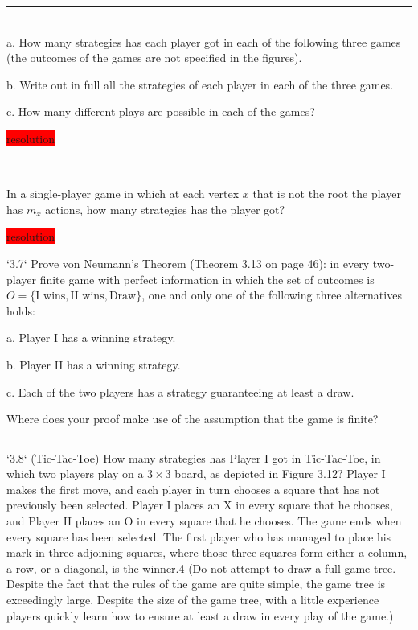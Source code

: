 \documentclass[10pt]{report}
\newenvironment{exercise}[1]
    {\vspace{0.5cm}\hrule\vspace{0.5cm}\noindent\fbox{#1}\\}
    {\vspace{0.5cm}}
\newenvironment{response}
{\vspace{0.2cm}\noindent\colorbox{red}{resolution}}
    {\vspace{0.5cm}}
\begin{document}
\begin{exercise}{3.5}
	a. How many strategies has each player got in each of the following three games (the outcomes of the games are not specified in the figures).

	b. Write out in full all the strategies of each player in each of the three games.

	c. How many different plays are possible in each of the games?

	\begin{response}
	\end{response}

\end{exercise}

\begin{exercise}{3.6}
	In a single-player game in which at each vertex $x$ that is not the root the player has $m_x$ actions, how many strategies has the player got?

	\begin{response}
	\end{response}
\end{exercise}

`3.7` Prove von Neumann’s Theorem (Theorem 3.13 on page 46): in every two-player finite game with perfect information in which the set of outcomes is $O = \{\text{I wins}, \text{II wins}, \text{Draw}\}$, one and only one of the following three alternatives holds:

a. Player I has a winning strategy.

b. Player II has a winning strategy.

c. Each of the two players has a strategy guaranteeing at least a draw.

Where does your proof make use of the assumption that the game is finite?

\vspace{0.5cm}
\hrule
\vspace{0.5cm}
`3.8` (Tic-Tac-Toe) How many strategies has Player I got in Tic-Tac-Toe, in which two players play on a $3\times 3$ board, as depicted in Figure 3.12? Player I makes the first move, and each player in turn chooses a square that has not previously been selected. Player I places an X in every square that he chooses, and Player II places an O in every square that he chooses. The game ends when every square has been selected. The first player who has managed to place his mark in three adjoining squares, where those three squares form either a column, a row, or a diagonal, is the winner.4 (Do not attempt to draw a full game tree. Despite the fact that the rules of the game are quite simple, the game tree is exceedingly large. Despite the size of the game tree, with a little experience players quickly learn how to ensure at least a draw in every play of the game.)
\end{document}
